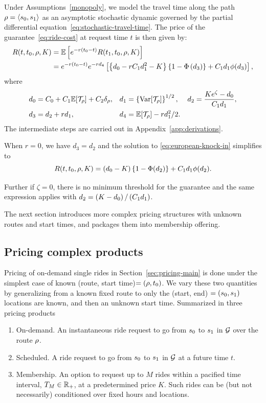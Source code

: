 \documentclass[12pt]{article}
\begin{document}
{{{{{{{Under Assumptions~\ref{monopoly}, we model the travel time along the path $\rho = {\langle {s_0},{ s_1}\rangle }$ as an asymptotic stochastic dynamic governed by the partial differential equation~\eqref{eq:stochastic-travel-time}. The price of the guarantee~\eqref{eq:ride-cost} at request time $t$ is then given by:
\begin{equation}\label{eq:european-knock-in}
\begin{aligned}
 R(t,t_0, \rho, K) &= \mathbb{E}\left[e^{-r(t_0-t)}R(t_1,t_0, \rho, K)\right] \\
  &=e^{-r(t_0-t)} e^{-rd_4}\left[\left\{d_0 - rC_1d_1^2- K\right\}\left\{1-\Phi\left(d_3\right)\right\} + C_1d_1 \phi(d_3)\right],
    \end{aligned}
\end{equation}
where 
\begin{align*}
    d_0 &= C_0 + C_1\mathbb{E}[\mathcal{T}_\rho] + C_2\delta_\rho, &
    d_1 &= \left\{\operatorname{{\rm Var}}[\mathcal{T}_\rho]\right\}^{1/2}, &
    d_2 &= \frac{Ke^\zeta -d_0}{C_1d_1}, \\
    d_3 &= d_2 + rd_1, &
    d_4 &= \mathbb{E}[\mathcal{T}_\rho] - rd_1^2/2. &&
\end{align*}
The intermediate steps are carried out in Appendix~\ref{app:derivations}.

When $r=0$, we have $d_3 = d_2$ and the solution to \eqref{eq:european-knock-in} simplifies to 
\[ R(t,t_0, \rho, K) = (d_0-K)\left\{1- \Phi(d_2)\right\} + C_1d_1\phi(d_2).\]

Further if $\zeta=0$, there is no minimum threshold for the guarantee and the same expression
applies with $d_2 = \left(K - d_0\right)/\left(C_1d_1\right)$.

The next section introduces more complex pricing structures with unknown routes and start times, and packages them into membership offering. 

\subsection{Pricing complex products}\label{sec:complex-pricing}
Pricing of on-demand single rides in Section~\ref{sec:pricing-main} is done under the simplest case of known (route, start time)$=(\rho, t_0)$. We vary these two quantities by generalizing from a known fixed route to only the (start, end) $=\left({s_0}, { s_1}\right)$ locations are known, and then an unknown start time. Summarized in three pricing products
\begin{enumerate}[label={(P$_{\arabic*})$}, ref={(P$_{\arabic*}$)}] 
    \item On-demand. An instantaneous ride request to go from  ${s_0}$ to ${ s_1}$ in $\mathcal{G}$ over the route $\rho$. \label{on-demand}
    \item Scheduled. A ride request to go from ${s_0}$ to ${ s_1}$ in $\mathcal{G}$ at a future time $t$. \label{scheduled}
    \item Membership. An option to request up to $M$ rides within a pacified time interval, $T_M \in \mathbb{R}_+$, at a predetermined price $K$. Such rides can be (but not necessarily) conditioned over fixed hours and locations.  \label{membership}
\end{enumerate}

}}}}}}}
\end{document}
